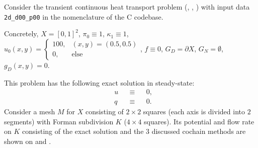 \begin{example}
  \label{idec/diffusion/continuous/transient/examples/2d_d00_p00-example}
  Consider the transient continuous heat transport problem
  (,
   ,
   )
  with input data \verb|2d_d00_p00| in the nomenclature of the C codebase.

  Concretely,
    $X = [0, 1]^2$,
    $\pi_0 \equiv 1$,
    $\kappa_1 \equiv 1$,
    $u_0(x, y) =
      \begin{cases}
        100, & (x, y) = (0.5, 0.5) \\
        0, & \text{else}
      \end{cases}$,
    $f \equiv 0$,
    $G_D = \partial X$,
    $G_N = \emptyset$,
    $g_D(x, y) = 0$.

  This problem has the following exact solution in steady-state:
  \begin{subequations}
    \begin{alignat}{3}
      & u && \equiv && 0, \\
      & q && \equiv && 0.
    \end{alignat}
  \end{subequations}
  Consider a mesh $M$ for $X$ consisting of $2 \times 2$ squares (each axis is
  divided into $2$ segments) with Forman subdivision $K$ ($4 \times 4$ squares).
  Its potential and flow rate on $K$ consisting of the exact solution
  and the $3$ discussed cochain methods are shown on
  and
  .
\end{example}
